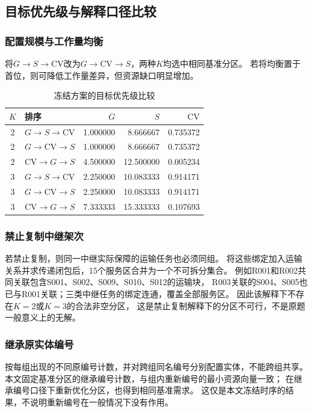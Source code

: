 \documentclass[bwprint]{gmcmthesis}
\begin{document}
\subsection{目标优先级与解释口径比较}
\subsubsection{配置规模与工作量均衡}
将$G\to S\to\mathrm{CV}$改为$G\to\mathrm{CV}\to S$，两种$K$均选中相同基准分区。
若将均衡置于首位，则可降低工作量差异，但资源缺口明显增加。
\begin{table}[htbp]
\centering
\small
\caption{冻结方案的目标优先级比较}
\label{tab:q4_priority}
\begin{tabular}{clrrr}
\toprule
$K$ & 排序 & $G$ & $S$ & $\mathrm{CV}$ \\
\midrule
2 & $G\to S\to\mathrm{CV}$ & 1.000000 & 8.666667 & 0.735372 \\
2 & $G\to\mathrm{CV}\to S$ & 1.000000 & 8.666667 & 0.735372 \\
2 & $\mathrm{CV}\to G\to S$ & 4.500000 & 12.500000 & 0.005234 \\
3 & $G\to S\to\mathrm{CV}$ & 2.250000 & 10.083333 & 0.914171 \\
3 & $G\to\mathrm{CV}\to S$ & 2.250000 & 10.083333 & 0.914171 \\
3 & $\mathrm{CV}\to G\to S$ & 7.333333 & 15.333333 & 0.107693 \\
\bottomrule
\end{tabular}
\end{table}

\subsubsection{禁止复制中继架次}
若禁止复制，则同一中继实际保障的运输任务也必须同组。
将这些绑定加入运输关系并求传递闭包后，15个服务区合并为一个不可拆分集合。
例如R001和R002共同关联包含S001、S002、S009、S010、S012的运输块，
R003关联的S004、S005也已与R001关联；三类中继任务的绑定连通，覆盖全部服务区。
因此该解释下不存在$K=2$或$K=3$的合法非空分区，
这是禁止复制解释下的分区不可行，不是原题一般意义上的无解。

\subsubsection{继承原实体编号}
按每组出现的不同原编号计数，并对跨组同名编号分别配置实体，不能跨组共享。
本文固定基准分区的继承编号计数，与组内重新编号的最小资源向量一致；
在继承编号口径下重新优化分区，也得到相同基准需求。
这仅是本文冻结时序的结果，不说明重新编号在一般情况下没有作用。
\end{document}
